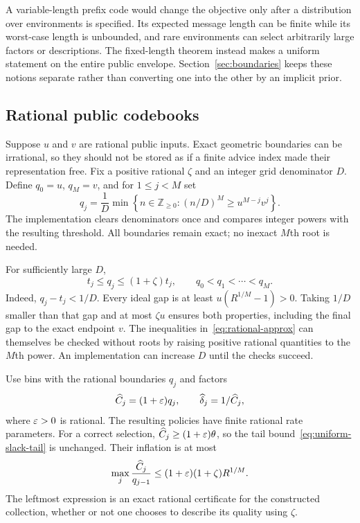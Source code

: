 A variable-length prefix code would change the objective only after a distribution over environments is specified.  Its expected message length can be finite while its worst-case length is unbounded, and rare environments can select arbitrarily large factors or descriptions.  The fixed-length theorem instead makes a uniform statement on the entire public envelope.  Section~\ref{sec:boundaries} keeps these notions separate rather than converting one into the other by an implicit prior.

\subsection{Rational public codebooks}\label{sec:encoding}
Suppose $u$ and $v$ are rational public inputs. Exact geometric boundaries can be irrational, so they should not be stored as if a finite advice index made their representation free. Fix a positive rational $\zeta$ and an integer grid denominator $D$. Define $q_0=u$, $q_M=v$, and for $1\leq j<M$ set
\begin{equation}\label{eq:rational-boundary}
 q_j=\frac1D\min\left\{n\in\mathbb Z_{\geq0}:
       (n/D)^M\geq u^{M-j}v^j\right\}.
\end{equation}
The implementation clears denominators once and compares integer powers with the resulting threshold. All boundaries remain exact; no inexact $M$th root is needed.

For sufficiently large $D$,
\begin{equation}\label{eq:rational-approx}
 t_j\leq q_j\leq(1+\zeta)t_j,
 \qquad q_0<q_1<\cdots<q_M.
\end{equation}
Indeed, $q_j-t_j<1/D$. Every ideal gap is at least $u(R^{1/M}-1)>0$. Taking $1/D$ smaller than that gap and at most $\zeta u$ ensures both properties, including the final gap to the exact endpoint $v$. The inequalities in~\eqref{eq:rational-approx} can themselves be checked without roots by raising positive rational quantities to the $M$th power. An implementation can increase $D$ until the checks succeed.

Use bins with the rational boundaries $q_j$ and factors
\begin{equation}\label{eq:rational-guard}
 \widehat C_j=(1+\varepsilon)q_j,
 \qquad\widehat\delta_j=1/\widehat C_j,
\end{equation}
where $\varepsilon>0$ is rational. The resulting policies have finite rational rate parameters. For a correct selection, $\widehat C_j\geq(1+\varepsilon)\theta$, so the tail bound~\eqref{eq:uniform-slack-tail} is unchanged. Their inflation is at most
\begin{equation}\label{eq:rational-inflation}
 \max_j\frac{\widehat C_j}{q_{j-1}}
 \leq(1+\varepsilon)(1+\zeta)R^{1/M}.
\end{equation}
The leftmost expression is an exact rational certificate for the constructed collection, whether or not one chooses to describe its quality using $\zeta$.

